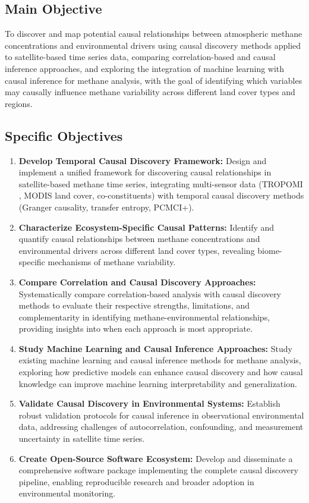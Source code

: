 \subsection{Main Objective}

To discover and map potential causal relationships between atmospheric methane concentrations and environmental drivers using causal discovery methods applied to satellite-based time series data, comparing correlation-based and causal inference approaches, and exploring the integration of machine learning with causal inference for methane analysis, with the goal of identifying which variables may causally influence methane variability across different land cover types and regions.

\subsection{Specific Objectives}

\begin{enumerate}
	\item \textbf{Develop Temporal Causal Discovery Framework:} Design and implement a unified framework for discovering causal relationships in satellite-based methane time series, integrating multi-sensor data (TROPOMI , MODIS land cover, co-constituents) with temporal causal discovery methods (Granger causality, transfer entropy, PCMCI+).

	\item \textbf{Characterize Ecosystem-Specific Causal Patterns:} Identify and quantify causal relationships between methane concentrations and environmental drivers across different land cover types, revealing biome-specific mechanisms of methane variability.

	\item \textbf{Compare Correlation and Causal Discovery Approaches:} Systematically compare correlation-based analysis with causal discovery methods to evaluate their respective strengths, limitations, and complementarity in identifying methane-environmental relationships, providing insights into when each approach is most appropriate.

	\item \textbf{Study Machine Learning and Causal Inference Approaches:} Study existing machine learning and causal inference methods for methane analysis, exploring how predictive models can enhance causal discovery and how causal knowledge can improve machine learning interpretability and generalization.

	\item \textbf{Validate Causal Discovery in Environmental Systems:} Establish robust validation protocols for causal inference in observational environmental data, addressing challenges of autocorrelation, confounding, and measurement uncertainty in satellite time series.

	\item \textbf{Create Open-Source Software Ecosystem:} Develop and disseminate a comprehensive software package implementing the complete causal discovery pipeline, enabling reproducible research and broader adoption in environmental monitoring.
\end{enumerate}

